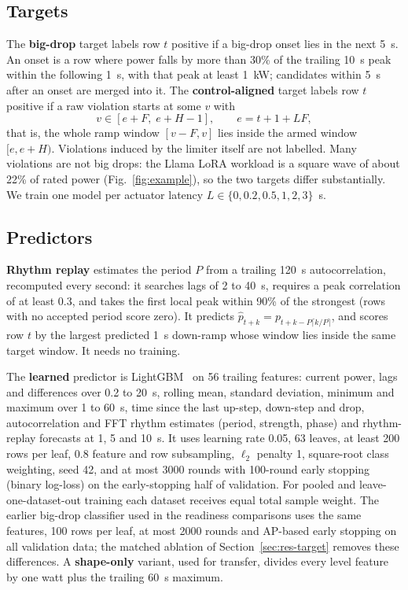 \documentclass[11pt]{article}
\begin{document}
\subsection{Targets}

The \textbf{big-drop} target labels row $t$ positive if a big-drop onset lies in the next 5~s. An onset
is a row where power falls by more than 30\% of the trailing 10~s peak within the following 1~s, with that
peak at least 1~kW; candidates within 5~s after an onset are merged into it. The \textbf{control-aligned} target labels row $t$ positive if a raw
violation starts at some $v$ with
\begin{equation}
v \in [e + F,\; e + H - 1], \qquad e = t + 1 + LF,
\end{equation}
that is, the whole ramp window $[v-F, v]$ lies inside the armed window $[e, e+H)$. Violations induced by
the limiter itself are not labelled. Many violations are not big drops: the Llama LoRA workload is a
square wave of about 22\% of rated power (Fig.~\ref{fig:example}), so the two targets differ
substantially. We train one model per actuator latency $L \in \{0, 0.2, 0.5, 1, 2, 3\}$~s.

\subsection{Predictors}

\textbf{Rhythm replay} estimates the period $P$ from a trailing 120~s autocorrelation, recomputed every
second: it searches lags of 2 to 40~s, requires a peak correlation of at least 0.3, and takes the first
local peak within 90\% of the strongest (rows with no accepted period score zero). It predicts $\hat p_{t+k} = p_{t+k-P\lceil k/P\rceil}$, and scores row $t$ by the largest predicted
1~s down-ramp whose window lies inside the same target window. It needs no training.

The \textbf{learned} predictor is LightGBM~\cite{lightgbm} on 56 trailing features: current power, lags
and differences over 0.2 to 20~s, rolling mean, standard deviation, minimum and maximum over 1 to 60~s,
time since the last up-step, down-step and drop, autocorrelation and FFT rhythm estimates (period,
strength, phase) and rhythm-replay forecasts at 1, 5 and 10~s. It uses learning rate 0.05, 63 leaves,
at least 200 rows per leaf, 0.8 feature and row subsampling, $\ell_2$ penalty 1, square-root class
weighting, seed 42, and at most 3000 rounds with 100-round early stopping (binary log-loss) on the
early-stopping half of validation. For pooled and leave-one-dataset-out training each dataset receives
equal total sample weight. The earlier big-drop classifier used in the readiness comparisons uses the same
features, 100 rows per leaf, at most 2000 rounds and AP-based early stopping on all validation data; the
matched ablation of Section~\ref{sec:res-target} removes these differences. A \textbf{shape-only} variant, used for transfer, divides every level feature by one watt plus the
trailing 60~s maximum.
\end{document}

